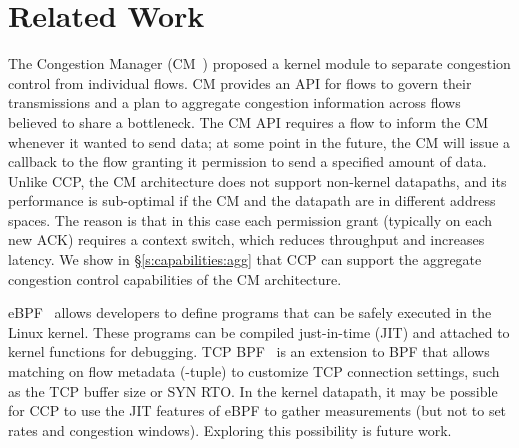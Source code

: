 \section{Related Work}
\label{s:relwork}
The Congestion Manager (CM~\cite{cm}) proposed a kernel module to separate congestion control from individual flows. CM provides an API for flows to govern their transmissions and a plan to aggregate congestion information across flows believed to share a bottleneck. The CM API requires a flow to inform the CM whenever it wanted to send data; at some point in the future, the CM will issue a callback to the flow granting it permission to send a specified amount of data. Unlike CCP, the CM architecture does not support non-kernel datapaths, and its performance is sub-optimal if the CM and the datapath are in different address spaces. The reason is that in this case each permission grant (typically on each new ACK) requires a context switch, which reduces throughput and increases latency. We show in \S\ref{s:capabilities:agg} that CCP can support the aggregate congestion control capabilities of the CM architecture.



eBPF~\cite{ebpf} allows developers to define programs that can be safely executed in the Linux kernel. These programs can be compiled just-in-time (JIT) and attached to kernel functions for debugging. TCP BPF~\cite{tcpbpf} is an extension to BPF that allows matching on flow metadata (-tuple) to customize TCP connection settings, such as the TCP buffer size or SYN RTO.
In the kernel datapath, it may be possible for CCP to use the JIT features of eBPF to gather measurements (but not to set rates and congestion windows).
Exploring this possibility is future work.

